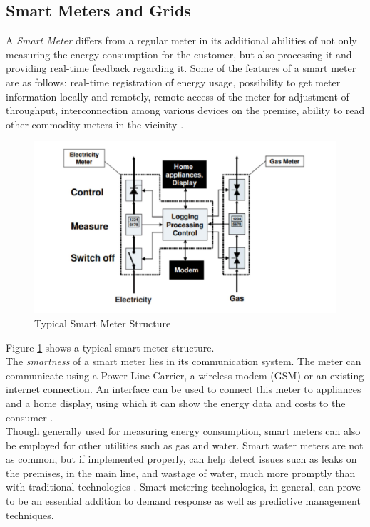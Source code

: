 \subsection{Smart Meters and Grids}
A {\em Smart Meter} differs from a regular meter in its additional abilities of not only measuring the energy consumption for the customer, but also processing it and providing real-time feedback regarding it. Some of the features of a smart meter are as follows:  real-time registration of energy usage, possibility to get meter information locally and remotely, remote access of the meter for adjustment of throughput, interconnection among various devices on the premise, ability to read other commodity meters in the vicinity \cite{leonardo05}.
\begin{figure}
	\includegraphics[width=1.0\columnwidth]{images/smart_meter.jpg}
	\caption{Typical Smart Meter Structure \cite{leonardo05}}
	\label{F:smart}
\end{figure}
Figure \ref{F:smart} shows a typical smart meter structure.\\
The {\em smartness} of a smart meter lies in its communication system. The meter can communicate using a Power Line Carrier, a wireless modem (GSM) or an existing internet connection. An interface can be used to connect this meter to appliances and a home display, using which it can show the energy data and costs to the consumer \cite{leonardo05}.\\
Though generally used for measuring energy consumption, smart meters can also be employed for other utilities such as gas and water. Smart water meters are not as common, but if implemented properly, can help detect issues such as leaks on the premises, in the main line, and wastage of water, much more promptly than with traditional technologies \cite{smartmeter09}. Smart metering technologies, in general, can prove to be an essential addition to demand response as well as predictive management techniques.\\
